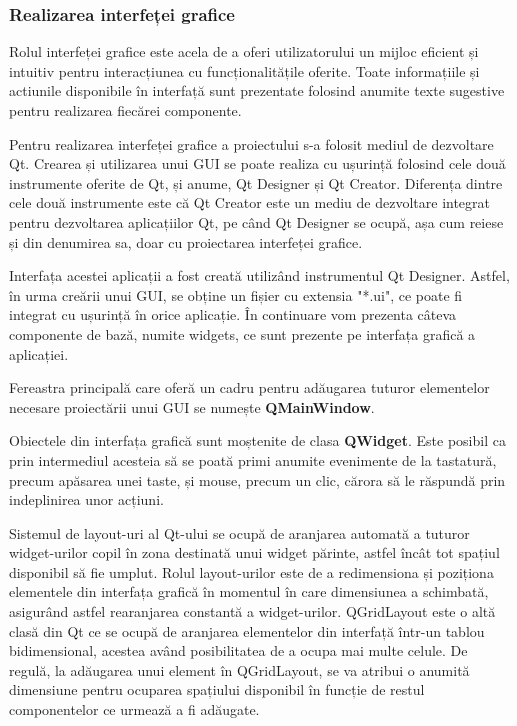 \documentclass[12pt]{article}
\begin{document}
\subsubsection{Realizarea interfeței grafice}

Rolul interfeței grafice este acela de a oferi utilizatorului un mijloc eficient și intuitiv pentru interacțiunea cu funcționalit\u{a}țile oferite. Toate informațiile și actiunile disponibile \^{i}n interfaț\u{a} sunt prezentate folosind anumite texte sugestive pentru realizarea fiec\u{a}rei componente.

Pentru realizarea interfeței grafice a proiectului s-a folosit mediul de dezvoltare Qt. Crearea și utilizarea unui GUI se poate realiza cu ușurinț\u{a} folosind cele dou\u{a} instrumente oferite de Qt, și anume, Qt Designer și Qt Creator. Diferența dintre cele dou\u{a} instrumente este c\u{a} Qt Creator este un mediu de dezvoltare integrat pentru dezvoltarea aplicațiilor Qt, pe c\^{a}nd Qt Designer se ocup\u{a}, așa cum reiese și din denumirea sa, doar cu proiectarea interfeței grafice.

Interfața acestei aplicații a fost creat\u{a} utiliz\^{a}nd instrumentul Qt Designer. Astfel, \^{i}n urma cre\u{a}rii unui GUI, se obține un fișier cu extensia "*.ui", ce poate fi integrat cu ușurinț\u{a} \^{i}n orice aplicație. \^{I}n continuare vom prezenta c\^{a}teva componente de baz\u{a}, numite widgets, ce sunt prezente pe interfața grafic\u{a} a aplicației.

Fereastra principal\u{a} care ofer\u{a} un cadru pentru ad\u{a}ugarea tuturor elementelor necesare proiect\u{a}rii unui GUI se numește \textbf{QMainWindow}.

Obiectele din interfața grafic\u{a} sunt moștenite de clasa \textbf{QWidget}. Este posibil ca prin intermediul acesteia s\u{a} se poat\u{a} primi anumite evenimente de la tastatur\u{a}, precum ap\u{a}sarea unei taste, și mouse, precum un clic, c\u{a}rora s\u{a} le r\u{a}spund\u{a} prin indeplinirea unor acțiuni.

Sistemul de layout-uri al Qt-ului se ocup\u{a} de aranjarea automat\u{a} a tuturor widget-urilor copil \^{i}n zona destinat\u{a} unui widget p\u{a}rinte, astfel \^{i}nc\^{a}t tot spațiul disponibil s\u{a} fie umplut. Rolul layout-urilor este de a redimensiona și poziționa elementele din interfața grafic\u{a} \^{i}n momentul \^{i}n care dimensiunea a schimbat\u{a}, asigur\^{a}nd astfel rearanjarea constant\u{a} a widget-urilor. QGridLayout este o alt\u{a} clas\u{a} din Qt ce se ocup\u{a} de aranjarea elementelor din interfaț\u{a} \^{i}ntr-un tablou bidimensional, acestea av\^{a}nd posibilitatea de a ocupa mai multe celule. De regul\u{a}, la ad\u{a}ugarea unui element \^{i}n QGridLayout, se va atribui o anumit\u{a} dimensiune pentru ocuparea spațiului disponibil \^{i}n funcție de restul componentelor ce urmeaz\u{a} a fi ad\u{a}ugate.
\end{document}
